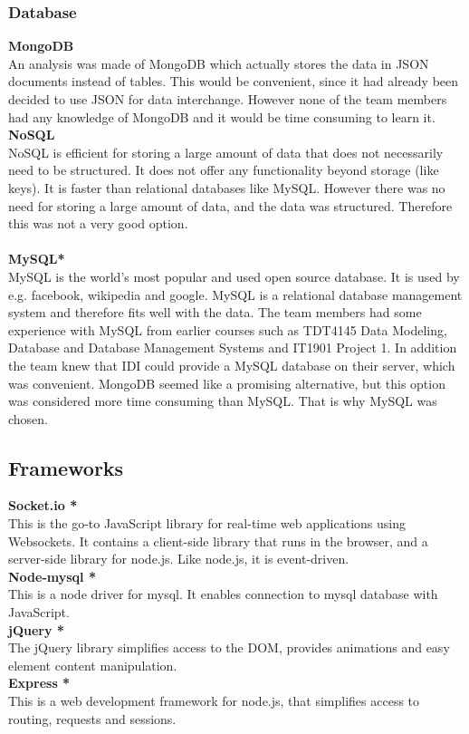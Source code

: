 \subsubsection{Database}
\textbf{MongoDB}\\
An analysis was made of MongoDB which actually stores the data in JSON documents instead of tables. This would be convenient, since it had already been decided to use JSON for data interchange. However none of the team members had any knowledge of MongoDB and it would be time consuming to learn it.
\\ \newline
\textbf{NoSQL}\\
NoSQL is efficient for storing a large amount of data that does not necessarily need to be structured. It does not offer any functionality beyond storage (like keys). It is faster than relational databases like MySQL. However there was no need for storing a large amount of data, and the data was structured. Therefore this was not a very good option.\\
\\ \newline
\textbf{MySQL*}\\
MySQL is the world’s most popular and used open source database. It is used by e.g. facebook, wikipedia and google. MySQL is a relational database management system and therefore fits well with the data. The team members had some experience with MySQL from earlier courses such as TDT4145 Data Modeling, Database and Database Management Systems and IT1901 Project 1. In addition the team knew that IDI could provide a MySQL database on their server, which was convenient. MongoDB seemed like a promising alternative, but this option was considered more time consuming than MySQL. That is why MySQL was chosen. 


\subsection{Frameworks}
\textbf{Socket.io *}\\
This is the go-to JavaScript library for real-time web applications using Websockets. It contains a client-side library that runs in the browser, and a server-side library for node.js. Like node.js, it is event-driven.
\\ \newline
\textbf{Node-mysql *}\\
This is a node driver for mysql. It enables connection to mysql database with JavaScript.
\\ \newline
\textbf{jQuery *}\\
The jQuery library simplifies access to the DOM, provides animations and easy element content manipulation.
\\ \newline
\textbf{Express *}\\
This is a web development framework for node.js, that simplifies access to routing, requests and sessions. 


